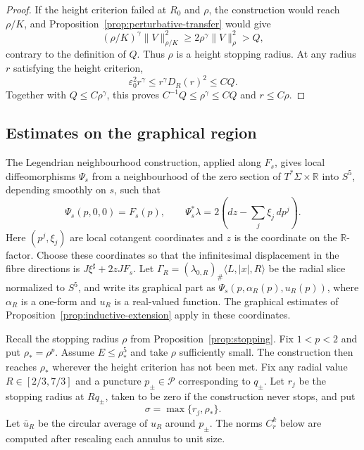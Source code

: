 \documentclass[11pt,a4paper]{article}
\numberwithin{equation}{section}
\theoremstyle{definition}
\theoremstyle{remark}
\newcommand{\R}{\mathbb R}
\begin{document}
\begin{proof}
		If the height criterion failed at $R_0$ and $\rho$, the construction
		would reach $\rho/K$, and Proposition~\ref{prop:perturbative-transfer} would give
		\[
		(\rho/K)^\gamma\|V\|_{\rho/K}^2
		\ge2\rho^\gamma\|V\|_\rho^2>Q,
		\]
		contrary to the definition of $Q$.
		Thus $\rho$ is a height stopping radius.
		At any radius $r$ satisfying the height criterion,
		\[
		\varepsilon_0^2r^\gamma
		\le r^\gamma D_R(r)^2\le CQ.
		\]
		Together with $Q\le C\rho^\gamma$, this proves
		$C^{-1}Q\le\rho^\gamma\le CQ$ and $r\le C\rho$.
	\end{proof}
	
	\subsection{Estimates on the graphical region}
	\label{sect:graphical-radial-slices}
	
	The Legendrian neighbourhood construction, applied along $F_s$, gives local
	diffeomorphisms $\Psi_s$ from a neighbourhood of the zero section of
	$T^*\Sigma\times\R$ into $S^5$, depending smoothly on $s$, such that
	\[
	\Psi_s(p,0,0)=F_s(p),\qquad
	\Psi_s^*\lambda=2\left(dz-\sum_j\xi_j\,dp^j\right).
	\]
	Here $(p^j,\xi_j)$ are local cotangent coordinates and $z$ is the
	coordinate on the $\R$-factor.
	Choose these coordinates so that the infinitesimal displacement in
	the fibre directions is $J\xi^\sharp+2zJF_s$.
	Let $\Gamma_R=(\lambda_{0,R})_\#\langle L,|x|,R\rangle$ be the radial
	slice normalized to $S^5$, and write its graphical part as
	$\Psi_s(p,\alpha_R(p),u_R(p))$, where $\alpha_R$ is a one-form
	and $u_R$ is a real-valued function.
	The graphical estimates of
	Proposition~\ref{prop:inductive-extension} apply in these coordinates.
	
	Recall the stopping radius $\rho$ from Proposition~\ref{prop:stopping}.
	Fix $1<p<2$ and put $\rho_*=\rho^p$.
	Assume $E\le\rho_*^5$ and take $\rho$ sufficiently small.
	The construction then reaches $\rho_*$ wherever the height criterion
	has not been met.
	Fix any radial value $R\in[2/3,7/3]$ and a puncture $p_\pm\in\mathcal P$
	corresponding to $q_\pm$.
	Let $r_j$ be the stopping radius at $Rq_\pm$, taken to be zero if
	the construction never stops, and put
	\[
	\sigma=\max\{r_j,\rho_*\}.
	\]
	Let $\bar u_R$ be the circular average of $u_R$ around $p_\pm$.
	The norms $C^k_r$ below are computed after rescaling each annulus
	to unit size.
	
\end{document}
